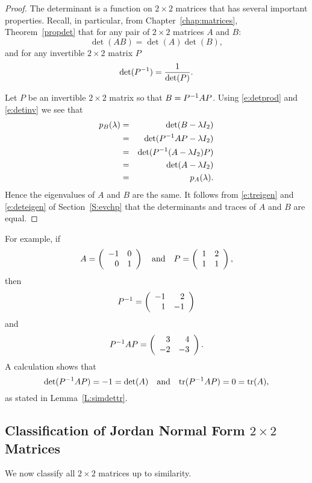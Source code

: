 \documentclass{ximera}
\begin{document}
\begin{proof}
The determinant is a function on $2\times 2$ matrices
that has several important properties.  Recall, in particular, from
Chapter~\ref{chap:matrices}, Theorem~\ref{propdet} that for any pair of
$2\times 2$ matrices $A$ and $B$:
\begin{equation} \label{e:detprod}
\det(AB) =  \det(A)\det(B),
\end{equation}
and for any invertible $2\times 2$ matrix $P$
\begin{equation}  \label{e:detinv}
\det(P^{-1})  =  \frac{1}{\det(P)}.
\end{equation}

Let $P$ be an invertible $2\times 2$ matrix so that $B=P^{-1} AP$.
Using \eqref{e:detprod} and \eqref{e:detinv} we see that
\begin{eqnarray*}
p_B(\lambda) & = & \det(B-\lambda I_2) \\
 & = & \det(P^{-1} AP-\lambda I_2) \\
& = & \det(P^{-1}(A-\lambda I_2)P) \\
& = & \det(A-\lambda I_2) \\
& = & p_A(\lambda).
\end{eqnarray*}
Hence the eigenvalues of $A$ and $B$ are the same.  It follows
from \eqref{e:treigen} and \eqref{e:deteigen} of Section~\ref{S:evchp}
that the determinants and traces of $A$ and $B$ are equal.   \end{proof}

For example, if
\[
A = \left(\begin{array}{rr} -1 & 0\\ 0 &1\end{array}\right) \quad\mbox{and}\quad  P = \left(\begin{array}{rr} 1 & 2\\ 1 &1\end{array}\right),
\]
then
\[
P^{-1} = \left(\begin{array}{rr} -1 & 2\\ 1 &-1\end{array}\right)
\]
and
\[
P^{-1} AP = \left(\begin{array}{rr} 3 & 4\\ -2 &-3\end{array}\right).
\]
A calculation shows that
\[
\det(P^{-1} AP)=-1=\det(A) \quad\mbox{and}\quad {\rm tr}(P^{-1} AP)=0={\rm tr}(A),
\]
as stated in Lemma~\ref{L:simdettr}.




\subsection*{Classification of Jordan Normal Form $2\times 2$ Matrices}

We now classify all $2\times 2$ matrices up to similarity.
\end{document}
